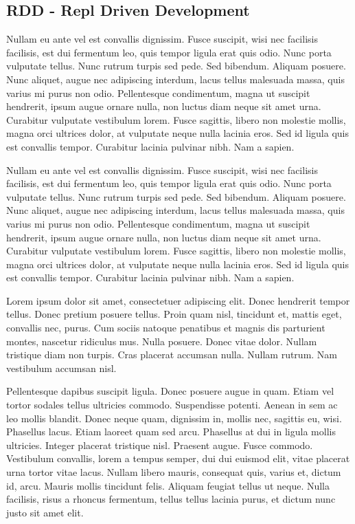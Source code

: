 \subsection{RDD - Repl Driven Development}

Nullam eu ante vel est convallis dignissim.  Fusce suscipit, wisi nec
facilisis facilisis, est dui fermentum leo, quis tempor ligula erat
quis odio.  Nunc porta vulputate tellus.  Nunc rutrum turpis sed pede.
Sed bibendum.  Aliquam posuere.  Nunc aliquet, augue nec adipiscing
interdum, lacus tellus malesuada massa, quis varius mi purus non odio.
Pellentesque condimentum, magna ut suscipit hendrerit, ipsum augue
ornare nulla, non luctus diam neque sit amet urna.  Curabitur
vulputate vestibulum lorem.  Fusce sagittis, libero non molestie
mollis, magna orci ultrices dolor, at vulputate neque nulla lacinia
eros.  Sed id ligula quis est convallis tempor.  Curabitur lacinia
pulvinar nibh.  Nam a sapien.

Nullam eu ante vel est convallis dignissim.  Fusce suscipit, wisi nec
facilisis facilisis, est dui fermentum leo, quis tempor ligula erat
quis odio.  Nunc porta vulputate tellus.  Nunc rutrum turpis sed pede.
Sed bibendum.  Aliquam posuere.  Nunc aliquet, augue nec adipiscing
interdum, lacus tellus malesuada massa, quis varius mi purus non odio.
Pellentesque condimentum, magna ut suscipit hendrerit, ipsum augue
ornare nulla, non luctus diam neque sit amet urna.  Curabitur
vulputate vestibulum lorem.  Fusce sagittis, libero non molestie
mollis, magna orci ultrices dolor, at vulputate neque nulla lacinia
eros.  Sed id ligula quis est convallis tempor.  Curabitur lacinia
pulvinar nibh.  Nam a sapien.

Lorem ipsum dolor sit amet, consectetuer adipiscing elit.  Donec
hendrerit tempor tellus.  Donec pretium posuere tellus.  Proin quam
nisl, tincidunt et, mattis eget, convallis nec, purus.  Cum sociis
natoque penatibus et magnis dis parturient montes, nascetur ridiculus
mus.  Nulla posuere.  Donec vitae dolor.  Nullam tristique diam non
turpis.  Cras placerat accumsan nulla.  Nullam rutrum.  Nam vestibulum
accumsan nisl.

Pellentesque dapibus suscipit ligula.  Donec posuere augue in quam.
Etiam vel tortor sodales tellus ultricies commodo.  Suspendisse
potenti.  Aenean in sem ac leo mollis blandit.  Donec neque quam,
dignissim in, mollis nec, sagittis eu, wisi.  Phasellus lacus.  Etiam
laoreet quam sed arcu.  Phasellus at dui in ligula mollis ultricies.
Integer placerat tristique nisl.  Praesent augue.  Fusce commodo.
Vestibulum convallis, lorem a tempus semper, dui dui euismod elit,
vitae placerat urna tortor vitae lacus.  Nullam libero mauris,
consequat quis, varius et, dictum id, arcu.  Mauris mollis tincidunt
felis.  Aliquam feugiat tellus ut neque.  Nulla facilisis, risus a
rhoncus fermentum, tellus tellus lacinia purus, et dictum nunc justo
sit amet elit.

